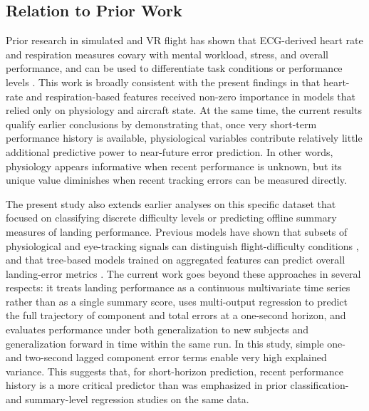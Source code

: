 \documentclass[11pt, a4paper]{article}
\begin{document}
\subsection{Relation to Prior Work}
Prior research in simulated and VR flight has shown that ECG-derived heart rate and respiration measures covary with mental workload, stress, and overall performance\cite{koerner-2025,bruna-2018,grassmann-2016}, and can be used to differentiate task conditions or performance levels \cite{caballero-2023, moore-2023}. This work is broadly consistent with the present findings in that heart-rate and respiration-based features received non-zero importance in models that relied only on physiology and aircraft state. At the same time, the current results qualify earlier conclusions by demonstrating that, once very short-term performance history is available, physiological variables contribute relatively little additional predictive power to near-future error prediction. In other words, physiology appears informative when recent performance is unknown, but its unique value diminishes when recent tracking errors can be measured directly.

The present study also extends earlier analyses on this specific dataset that focused on classifying discrete difficulty levels or predicting offline summary measures of landing performance. Previous models have shown that subsets of physiological and eye-tracking signals can distinguish flight-difficulty conditions \cite{caballero-2023, moore-2023}, and that tree-based models trained on aggregated features can predict overall landing-error metrics \cite{barry-2025}. The current work goes beyond these approaches in several respects: it treats landing performance as a continuous multivariate time series rather than as a single summary score, uses multi-output regression to predict the full trajectory of component and total errors at a one-second horizon, and evaluates performance under both generalization to new subjects and generalization forward in time within the same run. In this study, simple one- and two-second lagged component error terms enable very high explained variance. This suggests that, for short-horizon prediction, recent performance history is a more critical predictor than was emphasized in prior classification- and summary-level regression studies on the same data.
\end{document}
